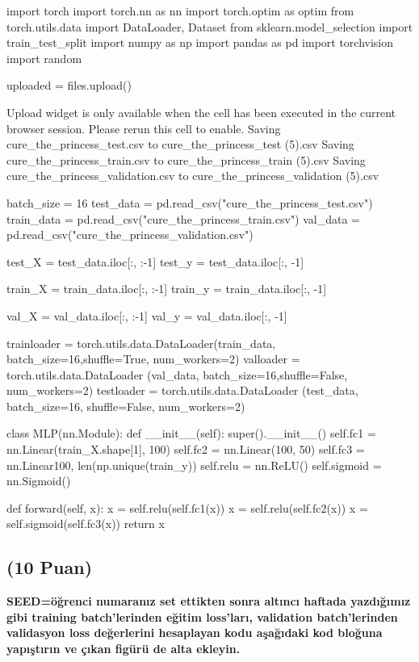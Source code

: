 \documentclass[11pt]{article}
\begin{document}
\begin{python}
import torch
import torch.nn as nn
import torch.optim as optim
from torch.utils.data import DataLoader, Dataset
from sklearn.model_selection import train_test_split
import numpy as np
import pandas as pd
import torchvision
import random


     

uploaded = files.upload()
     
Upload widget is only available when the cell has been executed in the current browser session. Please rerun this cell to enable.
Saving cure_the_princess_test.csv to cure_the_princess_test (5).csv
Saving cure_the_princess_train.csv to cure_the_princess_train (5).csv
Saving cure_the_princess_validation.csv to cure_the_princess_validation (5).csv

batch_size = 16
test_data = pd.read_csv("cure_the_princess_test.csv")
train_data = pd.read_csv("cure_the_princess_train.csv")
val_data = pd.read_csv("cure_the_princess_validation.csv")


test_X = test_data.iloc[:, :-1]
test_y = test_data.iloc[:, -1]

train_X = train_data.iloc[:, :-1]
train_y = train_data.iloc[:, -1]

val_X = val_data.iloc[:, :-1]
val_y = val_data.iloc[:, -1]


     

trainloader = torch.utils.data.DataLoader(train_data, batch_size=16,shuffle=True, num_workers=2)
valloader = torch.utils.data.DataLoader (val_data, batch_size=16,shuffle=False, num_workers=2)
testloader = torch.utils.data.DataLoader (test_data, batch_size=16, shuffle=False, num_workers=2)
     

class MLP(nn.Module):
    def __init__(self):
        super().__init__()
        self.fc1 = nn.Linear(train_X.shape[1], 100)
        self.fc2 = nn.Linear(100, 50)
        self.fc3 = nn.Linear100, len(np.unique(train_y))
        self.relu = nn.ReLU()
        self.sigmoid = nn.Sigmoid()

    def forward(self, x):
        x = self.relu(self.fc1(x))
        x = self.relu(self.fc2(x))
        x = self.sigmoid(self.fc3(x))
        return x

\end{python}

\subsection{(10 Puan)} \textbf{SEED=öğrenci numaranız set ettikten sonra altıncı haftada yazdığımız gibi training batch'lerinden eğitim loss'ları, validation batch'lerinden validasyon loss değerlerini hesaplayan kodu aşağıdaki kod bloğuna yapıştırın ve çıkan figürü de alta ekleyin.}
\end{document}
